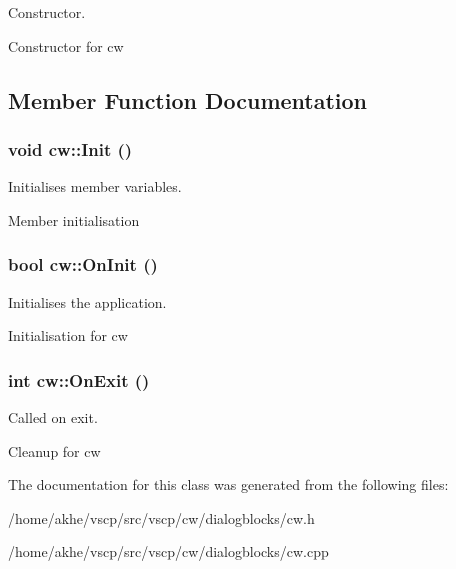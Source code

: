 Constructor. 

Constructor for cw 

\subsection{Member Function Documentation}
\subsubsection{\setlength{\rightskip}{0pt plus 5cm}void cw::Init ()}\label{classcw_6b2ed42dedbbef29b3a280b60696c7b5}


Initialises member variables. 

Member initialisation 
\subsubsection{\setlength{\rightskip}{0pt plus 5cm}bool cw::On\-Init ()\hspace{0.3cm}{\tt  [virtual]}}\label{classcw_e33c6d197d89dffbd1eed3f6a9d7b467}


Initialises the application. 

Initialisation for cw 
\subsubsection{\setlength{\rightskip}{0pt plus 5cm}int cw::On\-Exit ()\hspace{0.3cm}{\tt  [virtual]}}\label{classcw_ac7f2e07c134bd9eb78a674c8525c598}


Called on exit. 

Cleanup for cw 

The documentation for this class was generated from the following files:\begin{CompactItemize}
\item 
/home/akhe/vscp/src/vscp/cw/dialogblocks/cw.h\item 
/home/akhe/vscp/src/vscp/cw/dialogblocks/cw.cpp\end{CompactItemize}
